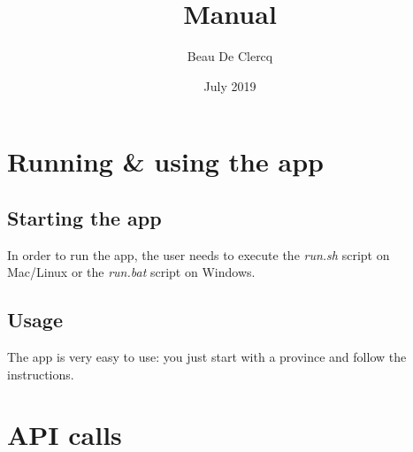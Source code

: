 \documentclass[12pt]{article}
\title{Manual}
\author{Beau De Clercq}
\date{July 2019}
\begin{document}
\maketitle{}

\tableofcontents

\clearpage
\newpage

\section{Running \& using the app}
\subsection{Starting the app}
In order to run the app, the user needs to execute the \emph{run.sh} script on Mac/Linux or the \emph{run.bat} script on Windows.

\subsection{Usage}
The app is very easy to use: you just start with a province and follow the instructions.

\newpage

\section{API calls}
\end{document}
